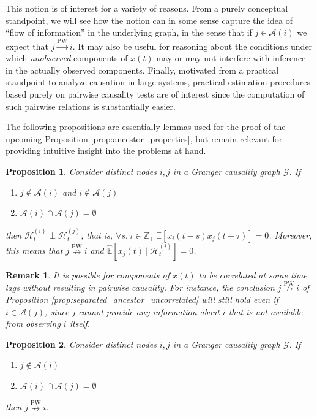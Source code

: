\documentclass{statsoc}
\def\pwgc{\overset{\text{PW}}{\rightarrow}}  %
\def\npwgc{\overset{\text{PW}}{\nrightarrow}}  %
\def\gcg{\mathcal{G}}  %
\def\H{\mathcal{H}}  %
\newcommand{\linE}[2]{\hat{\E}[#1\ |\ #2]}  %
\newcommand{\anc}[1]{\mathcal{A}(#1)}  %
\newtheorem{proposition}{Proposition}
\newtheorem{remark}{Remark}
\def\H{\mathcal{H}}  %
\def\E{\mathbb{E}}  %
\def\Z{\mathbb{Z}}  %
\begin{document}
This notion is of interest for a variety of reasons.  From a purely
conceptual standpoint, we will see how the notion can in some sense
capture the idea of ``flow of information'' in the underlying graph,
in the sense that if $j \in \anc{i}$ we expect that $j \pwgc i$.  It may
also be useful for reasoning about the conditions under which
\textit{unobserved} components of $x(t)$ may or may not interfere with
inference in the actually observed components.  Finally, motivated
from a practical standpoint to analyze causation in large systems,
practical estimation procedures based purely on pairwise causality
tests are of interest since the computation of such pairwise relations
is substantially easier.

The following propositions are essentially lemmas used for the proof
of the upcoming Proposition \ref{prop:ancestor_properties}, but
remain relevant for providing intuitive insight into the problems at
hand.

\begin{proposition}
  Consider distinct nodes $i, j$ in a Granger causality graph
  $\gcg$.  If

  \begin{enumerate}[label=(\alph*)]
    \item{$j \not\in \anc{i}$ and $i \not\in \anc{j}$}
    \item{$\anc{i}\cap\anc{j} = \emptyset$}
  \end{enumerate}

  then $\H_t^{(i)} \perp \H_t^{(j)}$, that is,
  $\forall s, \tau \in \Z_+\ \E[x_i(t - s)x_j(t - \tau)] = 0$.  Moreover,
  this means that $j \npwgc i$ and $\linE{x_j(t)}{\H_t^{(i)}} = 0$.
\end{proposition}

\begin{remark}
  It is possible for components of $x(t)$ to be correlated at some
  time lags without resulting in pairwise causality.  For instance,
  the conclusion $j \npwgc i$ of Proposition
  \ref{prop:separated_ancestor_uncorrelated} will still hold even if
  $i \in \anc{j}$, since $j$ cannot provide any information about $i$
  that is not available from observing $i$ itself.
\end{remark}

\begin{proposition}
  Consider distinct nodes $i, j$ in a Granger causality graph $\gcg$.
  If

  \begin{enumerate}[label=(\alph*)]
    \item{$j \not\in \anc{i}$}
    \item{$\anc{i}\cap\anc{j} = \emptyset$}
  \end{enumerate}

  then $j \npwgc i$.
\end{proposition}
\end{document}
